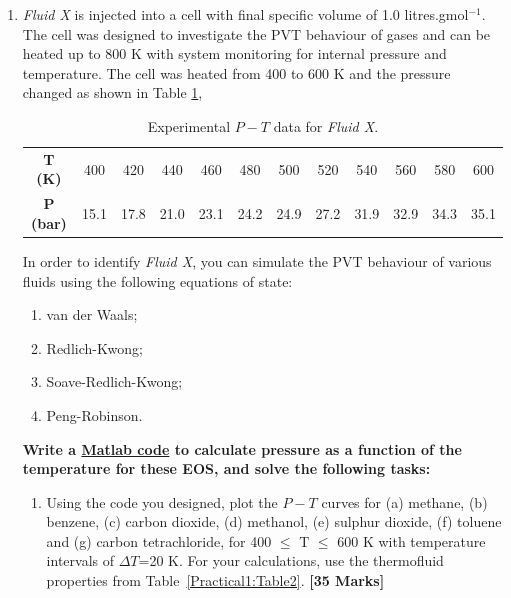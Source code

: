 \documentclass[12pts,a4paper,amsmath,amssymb,floatfix]{article}%
\renewcommand\leq{\leqslant}
\begin{document}
\begin{enumerate}[label=\bfseries Problem \arabic*:]

\item {\it Fluid X} is injected into a cell with final specific volume of 1.0 litres.gmol$^{-1}$. The cell was designed to investigate the PVT behaviour of gases and can be heated up to 800 K with system monitoring for internal pressure and temperature. The cell was heated from 400 to 600 K and the pressure changed as shown in Table \ref{Practical1:Table1},

\begin{table}[h]
\begin{center}
\begin{tabular}{|c | c c c c c c c c c c c|}
\hline
{\bf T (K)}   & 400  & 420  & 440  & 460  & 480  & 500  & 520  & 540  & 560  & 580  & 600 \\
{\bf P (bar)} & 15.1 & 17.8 & 21.0 & 23.1 & 24.2 & 24.9 & 27.2 & 31.9 & 32.9 & 34.3 & 35.1 \\
\hline
\end{tabular}
\caption{Experimental $P-T$ data for {\it Fluid X}.}
\label{Practical1:Table1}
\end{center}
\end{table} 

In order to identify {\it Fluid X}, you can simulate the PVT behaviour of various fluids using the following equations of state:
\begin{enumerate}
\item van der Waals;
\item Redlich-Kwong;
\item Soave-Redlich-Kwong;
\item Peng-Robinson.
\end{enumerate}
{\bf Write a \underline{Matlab code} to calculate pressure as a function of the temperature for these EOS, and solve the following tasks:}
 
\begin{enumerate}[label=\bfseries Task \arabic*]
\item\label{Practical1:Task1} Using the code you designed, plot the $P-T$ curves for (a) methane, (b) benzene, (c) carbon dioxide, (d) methanol, (e) sulphur dioxide, (f) toluene and (g) carbon tetrachloride, for 400 $\leq$ T $\leq$ 600 K with temperature intervals of $\Delta T$=20 K. For your calculations, use the thermofluid properties from Table~\ref{Practical1:Table2}. \hfill{\bf[35 Marks]}


\end{enumerate}
\end{enumerate}
\end{document}
